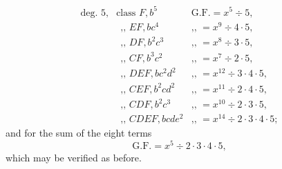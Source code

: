 \documentclass[11pt]{article}
\begin{document}
\clearpage
\[
\begin{array}{lll}
\text{deg.\ 5,} & \text{class } F, b^5 & \text{G.F.}= x^5 \div 5, \\
                & \text{$\ \ $,, } EF, bc^4 & \text{,, } = x^9 \div 4 \cdot 5, \\
                & \text{$\ \ $,, } DF, b^2c^3 & \text{,, } = x^8 \div 3 \cdot 5, \\
                & \text{$\ \ $,, } CF, b^3c^2 & \text{,, } = x^7 \div 2 \cdot 5, \\
                & \text{$\ \ $,, } DEF, bc^2d^2 & \text{,, } = x^{12} \div 3 \cdot 4 \cdot 5, \\
                & \text{$\ \ $,, } CEF, b^2cd^2 & \text{,, } = x^{11} \div 2 \cdot 4 \cdot 5, \\
                & \text{$\ \ $,, } CDF, b^2c^3 & \text{,, } = x^{10} \div 2 \cdot 3 \cdot 5, \\
                & \text{$\ \ $,, } CDEF, bcde^2 & \text{,, } = x^{14} \div 2 \cdot 3 \cdot 4 \cdot 5;
\end{array}
\]
and for the sum of the eight terms
\[
\text{G.F.}= x^5 \div 2 \cdot 3 \cdot 4 \cdot 5,
\]
which may be verified as before.
\end{document}
